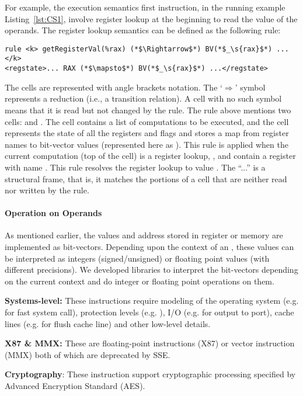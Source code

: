For example, the execution semantics first instruction, in the running example
Listing~\ref{lst:CS1}, involve register lookup at the
beginning to read the value of the operands.  The register lookup semantics can
be defined as the following \K rule:
\begin{lstlisting}[style=KRULE]
rule <k> getRegisterVal(%rax) (*$\Rightarrow$*) BV(*$_\s{rax}$*) ...</k>
<regstate>... RAX (*$\mapsto$*) BV(*$_\s{rax}$*) ...</regstate>
\end{lstlisting}

\noindent
The cells are represented with angle brackets notation. The `$\Rightarrow$' symbol
represents a reduction (i.e., a transition relation). A cell with no such symbol means that it is read but not changed by the rule.  The rule above
mentions two cells:  and . The  cell contains a list of
computations to be executed, and the  cell represents the
state of all the registers and flags and stores a map from register names to
bit-vector values (represented here as ). This rule
is applied when the current computation (top of the  cell) is a register
lookup, , and  contain a register
with name . This rule resolves the register lookup  to  value
. The ``...'' is a structural frame, that is, it matches the
portions of a cell that are neither read nor written by the rule.




\paragraph{Operation on Operands}
As mentioned earlier, the values and address stored in register or memory are implemented as bit-vectors. Depending upon the context of an , these values can be interpreted as integers (signed/unsigned) or floating point values (with different precisions). We developed libraries to interpret the bit-vectors depending on the current context and do integer or floating point operations on them.  

 \item \textbf{Systems-level:} These instructions require modeling  of the operating system (e.g.  for fast system call), protection levels (e.g. ), I/O (e.g.  for output to port), cache lines (e.g.  for flush cache line) and other low-level details. 
\item \textbf{X87 \& MMX:} These are floating-point instructions (X87)  or vector instruction (MMX) both of which are deprecated by SSE.
\item \textbf{Cryptography}: These instruction support cryptographic processing specified by Advanced Encryption Standard (AES). 

